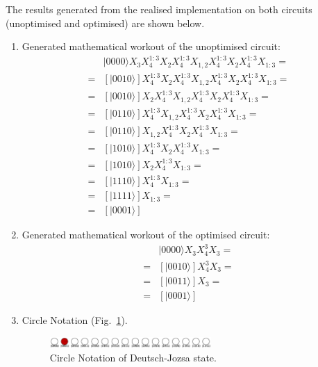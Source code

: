 \documentclass[sigconf,natbib=false]{acmart}
\begin{document}
    The results generated from the realised implementation on both circuits (unoptimised and optimised) are shown below.

    \begin{enumerate}
            \item Generated mathematical workout of the unoptimised circuit:
            \begin{align*}
             &|0000\rangle X_{3}X_{4}^{1:3}X_{2}X_{4}^{1:3}X_{1,2}X_{4}^{1:3}X_{2}X_{4}^{1:3}X_{1:3}=\\ 
                =& [ |0010\rangle ]X_{4}^{1:3}X_{2}X_{4}^{1:3}X_{1,2}X_{4}^{1:3}X_{2}X_{4}^{1:3}X_{1:3}=\\
                =& [ |0010\rangle ]X_{2}X_{4}^{1:3}X_{1,2}X_{4}^{1:3}X_{2}X_{4}^{1:3}X_{1:3}=\\
                =& [ |0110\rangle ]X_{4}^{1:3}X_{1,2}X_{4}^{1:3}X_{2}X_{4}^{1:3}X_{1:3}=\\
                =& [ |0110\rangle ]X_{1,2}X_{4}^{1:3}X_{2}X_{4}^{1:3}X_{1:3}=\\
                =& [ |1010\rangle ]X_{4}^{1:3}X_{2}X_{4}^{1:3}X_{1:3}=\\ 
                =& [ |1010\rangle ]X_{2}X_{4}^{1:3}X_{1:3}=\\ 
                =& [ |1110\rangle ]X_{4}^{1:3}X_{1:3}=\\ 
                =& [ |1111\rangle ]X_{1:3}=\\
                =& [ |0001\rangle ]
            \end{align*}

            \item Generated mathematical workout of the optimised circuit: 
            \begin{align*}
            &|0000\rangle X_{3}X_{4}^{3}X_{3}=\\
                =& [ |0010\rangle ]X_{4}^{3}X_{3}=\\
                =& [ |0011\rangle ]X_{3}=\\
                =& [ |0001\rangle ]
            \end{align*}
                
            \item Circle Notation (Fig.~\ref{dj}).
            \begin{figure}[!htb]
                \centerline{\includegraphics[width=0.58\textwidth]{dj}}
                \caption{Circle Notation of Deutsch-Jozsa state.}
                \label{dj}
            \end{figure}
            

\end{enumerate}
\end{document}
